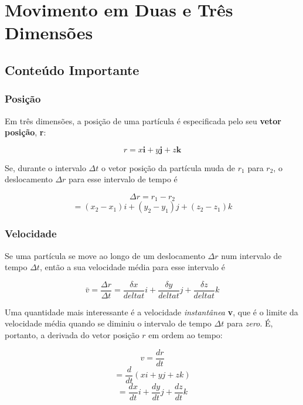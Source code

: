\section{Movimento em Duas e Três Dimensões}
\subsection{Conteúdo Importante}
\subsubsection{Posição}

Em três dimensões, a posição de uma partícula é especificada pelo seu \textbf{vetor posição}, \textbf{r}:

\begin{equation}
    r=x\mathbf{i}+y\mathbf{j}+z\mathbf{k}
\end{equation}

Se, durante o intervalo $\Delta t$ o vetor posição da partícula muda de $r_1$ para $r_2$, o deslocamento $\Delta r$ para esse intervalo de tempo é

\begin{equation}
    \Delta r=r_1-r_2
\end{equation}
\begin{equation}
    =(x_2-x_1)i+(y_2-y_1)j+(z_2-z_1)k
\end{equation}

\subsubsection{Velocidade}

Se uma partícula se move ao longo de um deslocamento $\Delta r$ num intervalo de tempo $\Delta t$, então a sua velocidade média para esse intervalo é

\begin{equation}
    \bar{v}=\frac{\Delta r}{\Delta t}=\frac{\delta x}{delta t}i+\frac{\delta y}{delta t}j+\frac{\delta z}{delta t}k
\end{equation}

Uma quantidade mais interessante é a velocidade \emph{instantânea} \textbf{v}, que é o limite da velocidade média quando se diminiu o intervalo de tempo $\Delta t$ para \emph{zero}. É, portanto, a derivada do vetor posição $r$ em ordem ao tempo:

\begin{equation}
    v=\frac{dr}{dt}
\end{equation}
\begin{equation}
    =\frac{d}{dt}(xi+yj+zk)
\end{equation}
\begin{equation}
    =\frac{dx}{dt}i+\frac{dy}{dt}j+\frac{dz}{dt}k
\end{equation}

